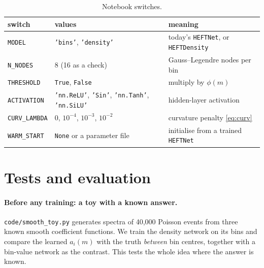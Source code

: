 \documentclass[11pt]{article}
\newcommand{\file}[1]{\nolinkurl{#1}}
\newcommand{\code}[1]{\texttt{#1}}
\begin{document}
\begin{table}[h]
\centering
\small
\begin{tabular}{lll}
\toprule
switch & values & meaning\\
\midrule
\code{MODEL} & \code{'bins'}, \code{'density'} & today's \code{HEFTNet}, or \code{HEFTDensity}\\
\code{N\_NODES} & 8 (16 as a check) & Gauss--Legendre nodes per bin\\
\code{THRESHOLD} & \code{True}, \code{False} & multiply by $\phi(m)$\\
\code{ACTIVATION} & \code{'nn.ReLU'}, \code{'Sin'}, \code{'nn.Tanh'}, \code{'nn.SiLU'} & hidden-layer activation\\
\code{CURV\_LAMBDA} & 0, $10^{-4}$, $10^{-3}$, $10^{-2}$ & curvature penalty \cref{eq:curv}\\
\code{WARM\_START} & \code{None} or a parameter file & initialise from a trained \code{HEFTNet}\\
\bottomrule
\end{tabular}
\caption{Notebook switches.}
\label{tab:switches}
\end{table}

\section{Tests and evaluation}
\label{sec:evaluation}

\paragraph{Before any training: a toy with a known answer.} \file{code/smooth_toy.py} generates
spectra of 40,000 Poisson events from three known smooth coefficient functions. We train the
density network on its bins and compare the learned $a_i(m)$ with the truth \emph{between} bin
centres, together with a bin-value network as the contrast. This tests the whole idea where the
answer is known.
\end{document}
